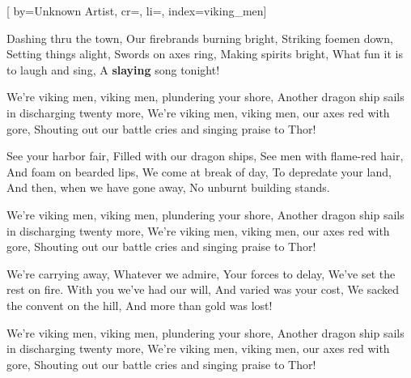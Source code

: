 

[%
    by={Unknown Artist},
    cr={},
    li={},
    index={viking_men}]


    \label{viking_men}

    \beginverse\memorize[verse]
        Dashing thru the town, Our firebrands burning bright,
        Striking foemen down, Setting things alight,
        Swords on axes ring, Making spirits bright,
        What fun it is to laugh and sing, A \textbf{slaying} song tonight!
    \endverse

    \beginchorus\memorize[chorus]
        We're viking men, viking men, plundering your shore,
        Another dragon ship sails in discharging twenty more, We're viking men,
        viking men, our axes red with gore,
        Shouting out our battle cries and singing praise to Thor!
    \endchorus

    \beginverse\replay[verse]
        See your harbor fair, Filled with our dragon ships,
        See men with flame-red hair, And foam on bearded lips,
        We come at break of day, To depredate your land,
        And then, when we have gone away, No unburnt building stands.
    \endverse

    \beginchorus\replay[chorus]
        We're viking men, viking men, plundering your shore,
        Another dragon ship sails in discharging twenty more, We're viking men,
        viking men, our axes red with gore,
        Shouting out our battle cries and singing praise to Thor!
    \endchorus

    \beginverse\replay[verse]
        We're carrying away, Whatever we admire,
        Your forces to delay, We've set the rest on fire.
        With you we've had our will, And varied was your cost,
        We sacked the convent on the hill, And more than gold was lost!
    \endverse

    \beginchorus\replay[chorus]
        We're viking men, viking men, plundering your shore,
        Another dragon ship sails in discharging twenty more, We're viking men,
        viking men, our axes red with gore,
        Shouting out our battle cries and singing praise to Thor!
    \endchorus

